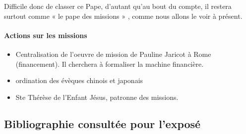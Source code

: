 Difficile donc de classer ce Pape, d’autant qu’au bout du compte, il restera surtout comme « le pape des missions » , comme nous allons le voir à présent.


\paragraph{Actions sur les missions}
\begin{itemize}
    \item Centralisation de l'oeuvre de mission de Pauline Jaricot à Rome (financement). Il cherchera à formaliser la machine financière.
    \item ordination des évèques chinois
    et japonais
    \item Ste Thérèse de l'Enfant Jésus, patronne des missions.
\end{itemize}



\subsection{Bibliographie consultée pour l’exposé}
 	

